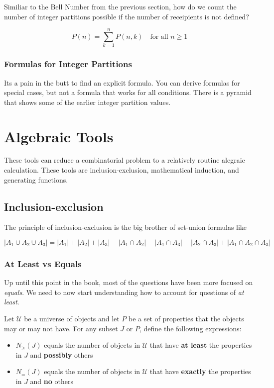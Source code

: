 \documentclass{article}
\begin{document}
Similiar to the Bell Number from the previous section, how do we count the number of integer partitions possible if the number of receipients is not defined?

\begin{equation*}
    P(n) = \sum_{k=1}^{n} P(n,k) \quad \text{for all } n \ge 1
\end{equation*}

\subsubsection{Formulas for Integer Partitions}

Its a pain in the butt to find an explicit formula. You can derive formulas for special cases, but not a formula that works for all conditions. There is a pyramid that shows some of the earlier integer partition values.

\section{Algebraic Tools}

These tools can reduce a combinatorial problem to a relatively routine alegraic calculation. These tools are inclusion-exclusion, mathematical induction, and generating functions.

\subsection{Inclusion-exclusion}

The principle of inclusion-exclusion is the big brother of set-union formulas like

\begin{equation*}
    |A_1 \cup A_2 \cup A_3| = |A_1| + |A_2| + |A_3| - |A_1 \cap A_2| - |A_1 \cap A_3| - |A_2 \cap A_3| + |A_1 \cap A_2 \cap A_3|
\end{equation*}

\subsubsection{At Least vs Equals}

Up until this point in the book, most of the questions have been more focused on \textit{equals}. We need to now start understanding how to account for questions of \textit{at least}.

\begin{definition}
    Let $\mathcal{U}$ be a universe of objects and let $P$ be a set of properties that the objects may or may not have. For any subset $J$ or $P$, define the following expressions:
    \begin{itemize}
        \item $N_{\ge}(J)$ equals the number of objects in $\mathcal{U}$ that have \textbf{at least} the properties in $J$ and \textbf{possibly} others
        \item $N_{=}(J)$ equals the number of objects in $\mathcal{U}$ that have \textbf{exactly} the properties in $J$ and \textbf{no} others
    \end{itemize}
\end{definition}
\end{document}
